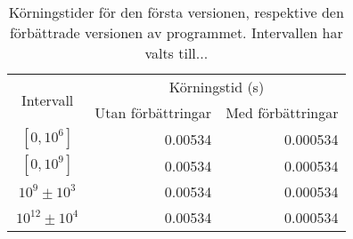 \renewcommand{\arraystretch}{1.3} %

\begin{table}[H]
\begin{center}
\begin{tabular}{|c||r|r|}
    \hline
    \multirow{2}{*}{\ Intervall\ } & \multicolumn{2}{c|}{Körningstid (s)}\\
    \cline{2-3}
    & Utan förbättringar & Med förbättringar\\
    \hline
    $\left[0,10^{6}\right]$ & 0.00534 & 0.000534\\
    $\left[0,10^{9}\right]$ & 0.00534 & 0.000534\\
    $10^{9}\pm 10^{3}$ & 0.00534 & 0.000534\\
    $10^{12}\pm 10^{4}$ & 0.00534 & 0.000534\\
    \hline
\end{tabular}
\end{center}
\label{implementering.tidtabell}
\caption{Körningstider för den första versionen, respektive den förbättrade versionen av programmet. Intervallen har valts till...}
\end{table}

